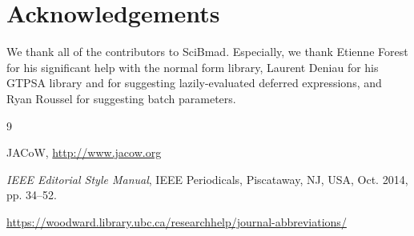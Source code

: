 \documentclass[a4paper,
               biblatex,     %
               ]{jacow}
\begin{document}
\section{Acknowledgements}
We thank all of the contributors to SciBmad. Especially, we thank Etienne Forest for his significant help with the normal form library, Laurent Deniau for his GTPSA library and for suggesting lazily-evaluated deferred expressions, and Ryan Roussel for suggesting batch parameters.


%
%
	{\printbibliography}%
	{%
	
	\begin{thebibliography}{9} %
	
		JACoW,
		\url{http://www.jacow.org}
	
		\textit{IEEE Editorial Style Manual},
		IEEE Periodicals, Piscataway,
		NJ, USA, Oct. 2014, pp. 34--52.

	\url{https://woodward.library.ubc.ca/researchhelp/journal-abbreviations/}

	\end{thebibliography}
} %
\end{document}
